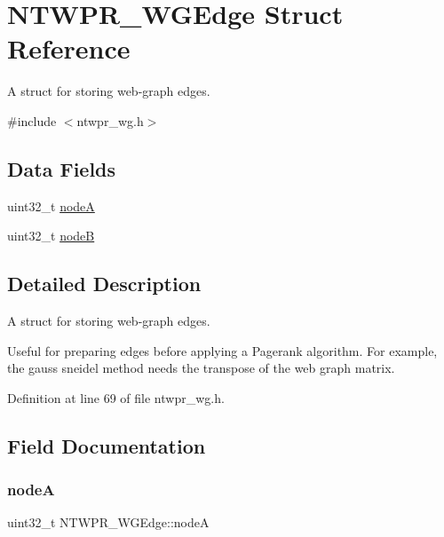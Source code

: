 \hypertarget{structNTWPR__WGEdge}{}\section{N\+T\+W\+P\+R\+\_\+\+W\+G\+Edge Struct Reference}
\label{structNTWPR__WGEdge}


A struct for storing web-\/graph edges.  




{\ttfamily \#include $<$ntwpr\+\_\+wg.\+h$>$}

\subsection*{Data Fields}
\begin{DoxyCompactItemize}
\item 
uint32\+\_\+t \mbox{\hyperlink{structNTWPR__WGEdge_a817882eb86490ad61dd36c6ed7ac47f8}{nodeA}}
\item 
uint32\+\_\+t \mbox{\hyperlink{structNTWPR__WGEdge_a0f9b43039574824cc76908125ad3661d}{nodeB}}
\end{DoxyCompactItemize}


\subsection{Detailed Description}
A struct for storing web-\/graph edges. 

Useful for preparing edges before applying a Pagerank algorithm. For example, the gauss sneidel method needs the transpose of the web graph matrix. 

Definition at line 69 of file ntwpr\+\_\+wg.\+h.



\subsection{Field Documentation}
\mbox{\label{structNTWPR__WGEdge_a817882eb86490ad61dd36c6ed7ac47f8}} 
\subsubsection{\texorpdfstring{nodeA}{nodeA}}
{\footnotesize\ttfamily uint32\+\_\+t N\+T\+W\+P\+R\+\_\+\+W\+G\+Edge\+::nodeA}

